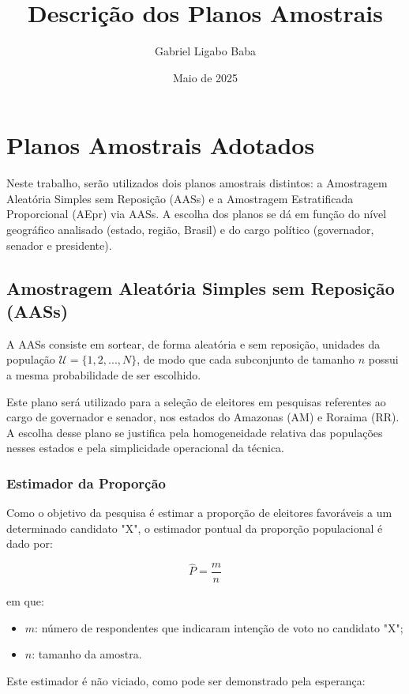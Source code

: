\documentclass{article}
\title{Descrição dos Planos Amostrais}
\author{Gabriel Ligabo Baba}
\date{Maio de 2025}
\begin{document}
\maketitle

\section*{Planos Amostrais Adotados}

Neste trabalho, serão utilizados dois planos amostrais distintos: a Amostragem Aleatória Simples sem Reposição (AASs) e a Amostragem Estratificada Proporcional (AEpr) via AASs.
A escolha dos planos se dá em função do nível geográfico analisado (estado, região, Brasil) e do cargo político (governador, senador e presidente).

\subsection*{Amostragem Aleatória Simples sem Reposição (AASs)}

A AASs consiste em sortear, de forma aleatória e sem reposição, unidades da população $\mathcal{U} = \{1, 2, ..., N\}$, de modo que cada subconjunto de tamanho $n$ possui a mesma probabilidade de ser escolhido. 

Este plano será utilizado para a seleção de eleitores em pesquisas referentes ao cargo de governador e senador, nos estados do Amazonas (AM) e Roraima (RR). 
A escolha desse plano se justifica pela homogeneidade relativa das populações nesses estados e pela simplicidade operacional da técnica.

\subsubsection*{Estimador da Proporção}

Como o objetivo da pesquisa é estimar a proporção de eleitores favoráveis a um determinado candidato "X", o estimador pontual da proporção populacional é dado por:

\[
\hat{P} = \frac{m}{n}
\]

em que:
\begin{itemize}
    \item $m$: número de respondentes que indicaram intenção de voto no candidato "X";
    \item $n$: tamanho da amostra.
\end{itemize}

Este estimador é não viciado, como pode ser demonstrado pela esperança:
\end{document}

